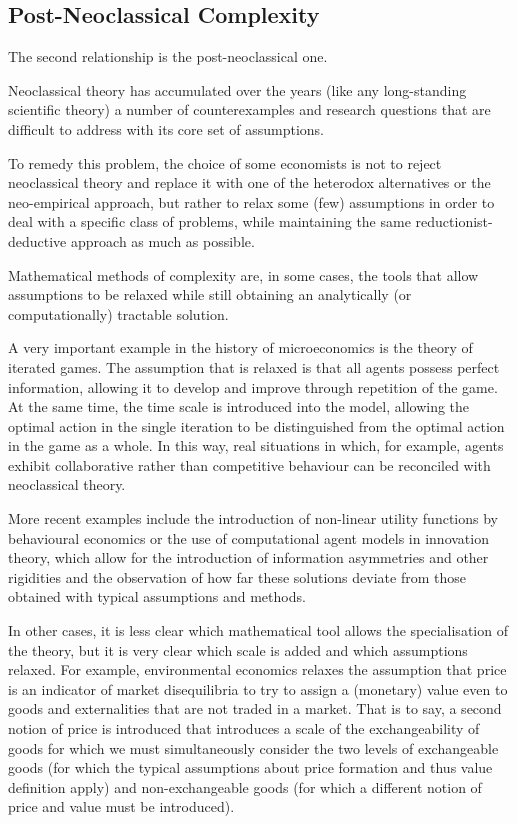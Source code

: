 \documentclass[a4paper, headings=standardclasses]{scrartcl}
\begin{document}
\subsection{Post-Neoclassical Complexity}
The second relationship is the post-neoclassical one.

Neoclassical theory has accumulated over the years (like any long-standing scientific theory) a number of counterexamples and research questions that are difficult to address with its core set of assumptions.

To remedy this problem, the choice of some economists is not to reject neoclassical theory and replace it with one of the heterodox alternatives or the neo-empirical approach, but rather to relax some (few) assumptions in order to deal with a specific class of problems, while maintaining the same reductionist-deductive approach as much as possible.

Mathematical methods of complexity are, in some cases, the tools that allow assumptions to be relaxed while still obtaining an analytically (or computationally) tractable solution.

A very important example in the history of microeconomics is the theory of iterated games. The assumption that is relaxed is that all agents possess perfect information, allowing it to develop and improve through repetition of the game. At the same time, the time scale is introduced into the model, allowing the optimal action in the single iteration to be distinguished from the optimal action in the game as a whole.
In this way, real situations in which, for example, agents exhibit collaborative rather than competitive behaviour can be reconciled with neoclassical theory.

More recent examples include the introduction of non-linear utility functions
by behavioural economics or the use of computational agent models in innovation theory, which allow for the introduction of information asymmetries and other rigidities and the observation of how far these solutions deviate from those obtained with typical assumptions and methods.

In other cases, it is less clear which mathematical tool allows the specialisation of the theory, but it is very clear which scale is added and which assumptions relaxed. For example, environmental economics relaxes the assumption that price is an indicator of market disequilibria to try to assign a (monetary) value even to goods and externalities that are not traded in a market.
That is to say, a second notion of price is introduced that introduces a scale of the exchangeability of goods for which we must simultaneously consider the two levels of exchangeable goods (for which the typical assumptions about price formation and thus value definition apply) and non-exchangeable goods (for which a different notion of price and value must be introduced).
\end{document}
